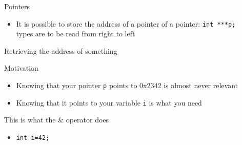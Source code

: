 \begin{Coupe}
\begin{frame}{Pointers}
\begin{block}
\begin{itemize}
    \item It is possible to store the address of a pointer of a pointer:
      \texttt{int ***p;}\\
       types are to be read from right to left
    \end{itemize}
  \end{block}
\end{frame}
\begin{frame}{Retrieving the address of something}
  \begin{block}{Motivation}
    \begin{itemize}
    \item Knowing that your pointer \texttt{p} points to 0x2342 is almost never relevant
    \item Knowing that it points to your variable \texttt{i} is what you need
    \end{itemize}
  \end{block}\vspace{-.5\baselineskip}
  \begin{block}{This is what the \alert{\&} operator does}
    \begin{itemize}
    \item \texttt{int i=42; }
    \end{itemize}
  \end{block}\vspace{-.5\baselineskip}


\end{frame}
\end{Coupe}
